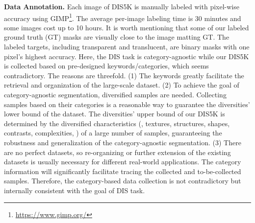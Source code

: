 \documentclass[10pt,twocolumn,letterpaper]{article}
\begin{document}
\noindent\textbf{Data Annotation.} Each image of DIS5K is manually labeled with pixel-wise accuracy using {GIMP}\footnote{\url{https://www.gimp.org/}}. 
The average per-image labeling time is 30 minutes and some images cost up to 10 hours. It is worth mentioning that some of our labeled ground truth (GT) masks are visually close to the image matting GT. 
The labeled targets, including transparent and translucent, are binary masks with one pixel's highest accuracy. 
Here, the DIS task is category-agnostic while our DIS5K is collected based on 
pre-designed keywords/categories, which seems contradictory. The reasons are threefold. 
(1) The keywords greatly facilitate the retrieval and organization of the large-scale dataset.
(2) To achieve the goal of category-agnostic segmentation, diversified samples are needed. Collecting samples based on their categories is a reasonable way to guarantee the diversities' lower bound of the dataset. The diversities' upper bound of our DIS5K is determined by the diversified characteristics (\eg, textures, structures, shapes, contrasts, complexities, \etc) of a large number of samples, guaranteeing the robustness and generalization of the category-agnostic segmentation. 
(3) There are no perfect datasets, so re-organizing or further extension of the existing datasets is usually necessary for different real-world applications. The category information will significantly facilitate tracing the collected and to-be-collected samples. Therefore, the category-based data collection is not contradictory but internally consistent with the goal of DIS task. 
\end{document}
